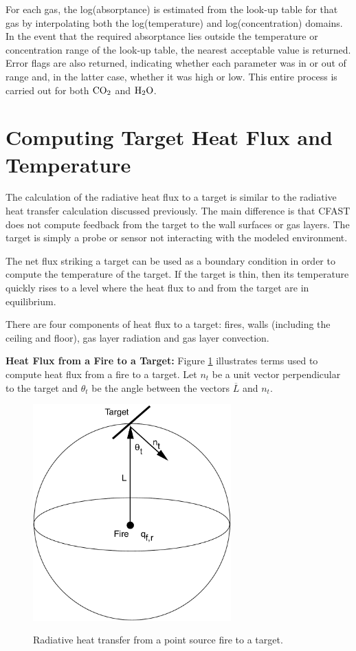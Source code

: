 For each gas, the log(absorptance) is estimated from the look-up table for that gas  by  interpolating both the log(temperature) and log(concentration) domains. In the event that the required absorptance lies outside the temperature or concentration range of the look-up table, the nearest acceptable value is returned. Error flags are also returned, indicating whether each parameter was in or out of range and, in the latter case, whether it was high or low.  This entire process is carried out for both $\textnormal{CO}_2$  and $\textnormal{H}_2 \textnormal{O}$.

\section{Computing Target Heat Flux and Temperature}

The calculation of the radiative heat flux to a target is similar to the radiative heat transfer calculation discussed previously.  The main difference is that CFAST does not compute feedback from the target to the wall surfaces or gas layers.  The target is simply a probe or sensor not interacting with the modeled environment.

The net flux striking a target can be used as a boundary condition in order to compute the temperature of the target.  If the target is thin, then its temperature quickly rises to a level where the heat flux to and from the target are in equilibrium.

There are four components of heat flux to a target: fires, walls (including the ceiling and floor), gas layer radiation and gas layer convection.

{\bf Heat Flux from a Fire to a Target:} Figure \ref{fig:Rad_Fire} illustrates terms used to compute heat flux from a fire to a target. Let $n_t$ be a unit vector perpendicular to the target and $\theta_t$ be the angle between the vectors $\overline{L}$ and $n_t$.

\begin{figure}
\begin{center}
\includegraphics[width=3.0in]{FIGURES/Theory/Radiation_Fire}\\
\end{center}
\caption{Radiative heat transfer from a point source fire to a target.}
 \label{fig:Rad_Fire}
\end{figure}

